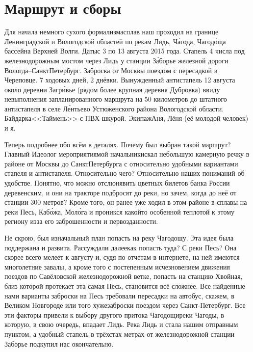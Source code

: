 \chapter{Маршрут и сборы}

Для начала немного сухого формализма\mdash сплав наш проходил на границе Ленинградской и Вологодской областей по рекам Лидь, Ч\'{а}года, Чагод\'{о}ща бассейна Верхней Волги. Даты\mdash с 3 по 13 августа 2015 года. Стапель 4 числа под железнодорожным мостом через Лидь у станции З\'{а}борье железной дороги Вологда\nobreakdash--Санкт\sdash Петербург. Заброска от Москвы поездом с пересадкой в Череповце. 7 ходовых дней, 2 днёвки. Вынужденный антистапель 12 августа около деревни Загр\'{и}вье (рядом более крупная деревня Дубровка) ввиду невыполнения запланированного маршрута на 50 километров до штатного антистапеля в селе Л\'{е}нтьево Устюженского района Вологодской области.  Байдарка\mdash <<Таймень>> с ПВХ шкурой. Экипаж\mdash Аня, Лёня (её молодой человек) и я.

Теперь подробнее обо всём в деталях. Почему был выбран такой маршрут? Главный Идеолог мероприятия\mdash мой начальник\mdash искал небольшую камерную речку в районе от Москвы до Санкт\sdash Петербурга с относительно удобными вариантами стапеля и антистапеля. Относительно чего? Относительно наших пониманий об удобстве. Понятно, что можно отслюнявить цветных билетов банка России деревенским, и они на тракторе подбросят до реки, но зачем, когда до неё от станции 300 метров? Кроме того, он ранее уже ходил в этом районе в сплавы на реки Песь, Каб\'{о}жа, Мол\'{о}га и проникся какой\sdash то особенной теплотой к этому региону из\sdash за его заброшенности и первозданности.

Не скрою, был изначальный план попасть на реку Чагодощу. Эта идея была поддержана и развита. Рассуждали далее\mdash как попасть туда? С реки Песь? Она скорее всего мелеет к августу и, судя по отчетам в интернете, на ней имеются многолетние завалы, а кроме того с постепенным исчезновением движения поездов по Савёловской железнодорожной ветке, попасть на станцию Хвойная, близ которой протекает эта самая Песь, становится всё сложнее. Все найденные нами варианты заброски на Песь требовали пересадки на автобус, скажем, в Великом Новгороде или того хуже\mdash заброски поездом через Санкт-Петербург. Все эти факторы привели к выбору другого притока Чагодощи\mdash реки Чагоды, в которую, в свою очередь, впадает Лидь. Река Лидь и стала нашим отправным пунктом, а удобный стапель в трёхстах метрах от железнодорожной станции Заборье подкупил нас окончательно. 

